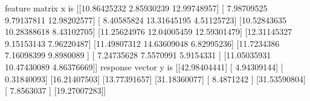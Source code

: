 \documentclass[letterpaper,10pt,english]{sphinxmanual}
\begin{document}
\begin{sphinxVerbatim}[commandchars=\\\{\}]
     
                       \PYG{p}{[}  \PYG{p}{]}
                       
                       
                       
                       
                       
 
 

\end{sphinxVerbatim}

\begin{sphinxVerbatim}[commandchars=\\\{\}]
feature matrix x is 
 [[10.86425232  2.85930239 12.99748957]
 [ 7.98709525  9.79137811 12.98202577]
 [ 8.40585824 13.31645195  4.51125723]
 [10.52843635 10.28388618  8.43102705]
 [11.25624976 12.04005459 12.59301479]
 [12.31145327  9.15153143  7.96220487]
 [11.49807312 14.63609048  6.82995236]
 [11.7234386   7.16098399  9.8980089 ]
 [ 7.24735628  7.5570991   5.9154331 ]
 [11.05035931 10.47430089  4.86376669]]
response vector y is 
 [[\PYGZhy{}42.98404441]
 [ \PYGZhy{}4.94309144]
 [  0.31840093]
 [\PYGZhy{}16.21407503]
 [\PYGZhy{}13.77391657]
 [\PYGZhy{}31.18360077]
 [ \PYGZhy{}8.4871242 ]
 [\PYGZhy{}31.53590804]
 [ \PYGZhy{}7.8563037 ]
 [\PYGZhy{}19.27007283]]
\end{sphinxVerbatim}
\end{document}
